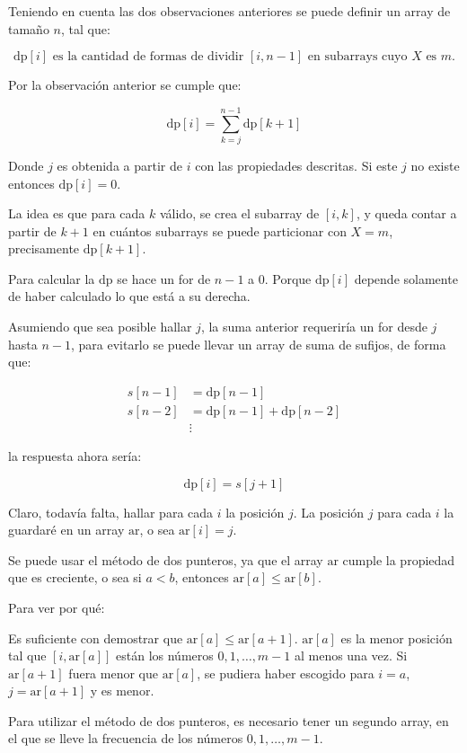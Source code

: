 \documentclass[14pt]{extarticle}
\begin{document}
Teniendo en cuenta las dos observaciones anteriores se puede definir un array de tamaño $n$, tal que:

\[
\text{dp}[i] \text{ es la cantidad de formas de dividir } [i, n-1] \text{ en subarrays cuyo } X \text{ es } m.
\]

Por la observación anterior se cumple que:

\[
\text{dp}[i] = \sum_{k=j}^{n-1} \text{dp}[k + 1]
\]

Donde $j$ es obtenida a partir de $i$ con las propiedades descritas. Si este $j$ no existe entonces $\text{dp}[i] = 0$.

La idea es que para cada $k$ válido, se crea el subarray de $[i, k]$, y queda contar a partir de $k+1$ en cuántos subarrays se puede particionar con $X = m$, precisamente $\text{dp}[k+1]$.

Para calcular la $\text{dp}$ se hace un for de $n-1$ a $0$. Porque $\text{dp}[i]$ depende solamente de haber calculado lo que está a su derecha.

Asumiendo que sea posible hallar $j$, la suma anterior requeriría un for desde $j$ hasta $n-1$, para evitarlo se puede llevar un array de suma de sufijos, de forma que:

\begin{align*}
s[n-1] &= \text{dp}[n-1] \\
s[n-2] &= \text{dp}[n-1] + \text{dp}[n-2] \\
&\vdots
\end{align*}

la respuesta ahora sería:

\[
\text{dp}[i] = s[j + 1]
\]

Claro, todavía falta, hallar para cada $i$ la posición $j$. La posición $j$ para cada $i$ la guardaré en un array $\text{ar}$, o sea $\text{ar}[i] = j$.

Se puede usar el método de dos punteros, ya que el array $\text{ar}$ cumple la propiedad que es creciente, o sea si $a < b$, entonces $\text{ar}[a] \leq \text{ar}[b]$.

Para ver por qué: 

Es suficiente con demostrar que $\text{ar}[a] \leq \text{ar}[a+1]$. $\text{ar}[a]$ es la menor posición tal que $[i, \text{ar}[a]]$ están los números $0, 1, \ldots, m-1$ al menos una vez. Si $\text{ar}[a+1]$ fuera menor que $\text{ar}[a]$, se pudiera haber escogido para $i = a$, $j = \text{ar}[a+1]$ y es menor.

Para utilizar el método de dos punteros, es necesario tener un segundo array, en el que se lleve la frecuencia de los números $0, 1, \ldots, m-1$.
\end{document}
